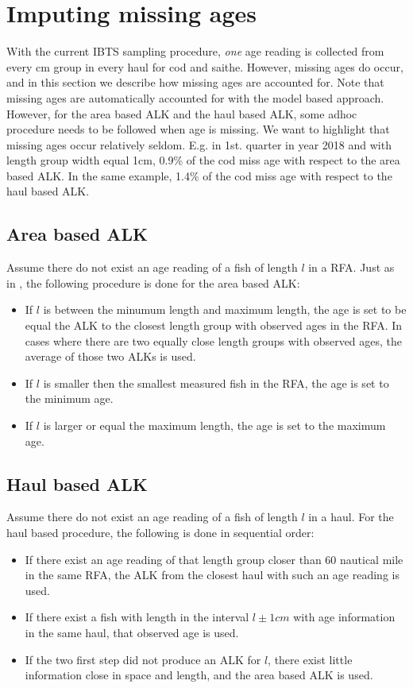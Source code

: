 \documentclass[a4paper 12pt]{article}
\numberwithin{equation}{section}
\begin{document}
\section{\large Imputing missing ages}
\label{sec:imputationappendix}
With the current IBTS sampling procedure, \textit{one} age reading is collected from every cm group in every haul for cod and saithe. However, missing ages do occur, and in this section we describe how missing ages are accounted for. Note that missing ages are automatically accounted for with the model based approach. However, for the area based ALK and the haul based ALK, some adhoc procedure needs to be followed when age is missing. We want to highlight that missing ages occur relatively seldom. E.g. in 1st. quarter in year 2018 and with length group width equal 1cm, 0.9\% of the cod miss age with respect to the area based ALK. In the same example, 1.4\% of the cod miss age with respect to the haul based ALK.


\subsection{\normalsize Area based ALK}
\label{secAp:DATRASBorrow}
Assume there do not exist an age reading of a fish of length $l$ in a RFA. Just as in \citep{ICES2013}, the following procedure is done for the area based ALK:
\begin{itemize}
\item If $l$ is between the minumum length and maximum length, the age is set to be equal the ALK to the closest length group with observed ages in the RFA. In cases where there are two equally close length groups with observed ages, the average of those two ALKs is used. 
\item If $l$ is smaller then the smallest measured fish in the RFA, the age is set to the minimum age.
\item If $l$ is larger or equal the maximum length, the age is set to the maximum age.
\end{itemize}


\subsection{\normalsize Haul based ALK}
\label{secAp:oursBorrow}
Assume there do not exist an age reading of a fish of length $l$ in a haul. For the haul based procedure, the following is done in sequential order:
\begin{itemize}
\item If there exist an age reading of that length group closer than 60 nautical mile in the same RFA, the ALK from the closest haul with such an age reading is used.
\item If there exist a fish with length in the interval $l\pm 1cm$ with age information in the same haul, that observed age is used.  
\item If the two first step did not produce an ALK for $l$, there exist little information close in space and length, and the area based ALK is used.
\end{itemize}
\end{document}
